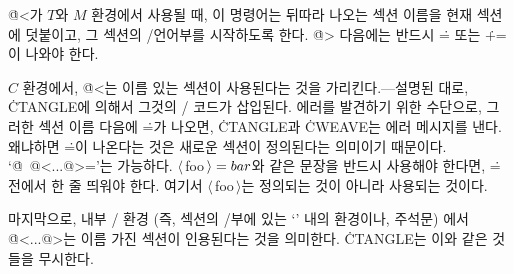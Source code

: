 \more \.{@<}가 $T$와 $M$ 환경에서 사용될 때, 이 명령어는 뒤따라 나오는
섹션 이름을 현재 섹션에 덧붙이고, 그 섹션의 \CEE/언어부를 시작하도록 한다.
\.{@>} 다음에는 반드시 \.{=} 또는 \.{+=}이 나와야 한다.  

\more
$C$ 환경에서, \.{@<}는 이름 있는 섹션이 사용된다는 것을
가리킨다.--- 설명된 대로, \.{CTANGLE}에 의해서
그것의 \CEE/ 코드가 삽입된다. 에러를 발견하기 위한
수단으로, 그러한 섹션 이름 다음에 \.=가
나오면, \.{CTANGLE}과 \.{CWEAVE}는 에러 메시지를 낸다. 왜냐하면 \.=이
나온다는 것은 새로운 섹션이 정의된다는 의미이기
때문이다. `\.{@\ @<...@>=}'는
가능하다. $\langle\,$foo$\,\rangle=\\{bar}$와 같은 문장을 반드시
사용해야 한다면, \.= 전에서 한 줄 띄워야 한다. 여기서
$\langle\,$foo$\,\rangle$는 정의되는 것이 아니라 사용되는 것이다.

\more
마지막으로, 내부 \CEE/ 환경 (즉, 섹션의 \TEX/부에 있는 `\pb' 내의
환경이나, 주석문) 에서 \.{@<...@>}는 이름 가진 섹션이 인용된다는 것을
의미한다. \.{CTANGLE}는 이와 같은 것들을 무시한다.

